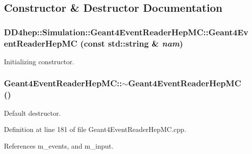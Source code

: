 \subsection{Constructor \& Destructor Documentation}
\hypertarget{class_d_d4hep_1_1_simulation_1_1_geant4_event_reader_hep_m_c_adc7e0e034d70567c3287a72121b21d0e}{
\subsubsection[{Geant4EventReaderHepMC}]{\setlength{\rightskip}{0pt plus 5cm}DD4hep::Simulation::Geant4EventReaderHepMC::Geant4EventReaderHepMC (const std::string \& {\em nam})}}
\label{class_d_d4hep_1_1_simulation_1_1_geant4_event_reader_hep_m_c_adc7e0e034d70567c3287a72121b21d0e}


Initializing constructor. \hypertarget{class_d_d4hep_1_1_simulation_1_1_geant4_event_reader_hep_m_c_a437c86083e7da05be4821da864d8954a}{
\subsubsection[{$\sim$Geant4EventReaderHepMC}]{\setlength{\rightskip}{0pt plus 5cm}Geant4EventReaderHepMC::$\sim$Geant4EventReaderHepMC ()}}
\label{class_d_d4hep_1_1_simulation_1_1_geant4_event_reader_hep_m_c_a437c86083e7da05be4821da864d8954a}


Default destructor. 

Definition at line 181 of file Geant4EventReaderHepMC.cpp.

References m\_\-events, and m\_\-input.

